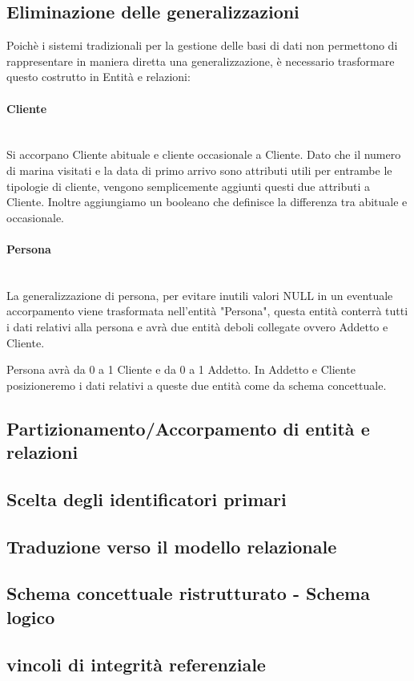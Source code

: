 \subsection{Eliminazione delle generalizzazioni}

Poichè i sistemi tradizionali per la gestione delle basi di dati non permettono di rappresentare in maniera diretta una generalizzazione, è necessario trasformare questo costrutto in Entità e relazioni:

\paragraph{Cliente}\mbox{}\\
Si accorpano Cliente abituale e cliente occasionale a Cliente. Dato che il numero di marina visitati e la data di primo arrivo sono attributi utili per entrambe le tipologie di cliente, vengono semplicemente aggiunti questi due attributi a Cliente. Inoltre aggiungiamo un booleano che definisce la differenza tra abituale e occasionale.
\paragraph{Persona}\mbox{}\\
La generalizzazione di persona, per evitare inutili valori NULL in un eventuale accorpamento viene trasformata nell'entità "Persona", questa entità conterrà tutti i dati relativi alla persona e avrà due entità deboli collegate ovvero Addetto e Cliente.

Persona avrà da 0 a 1 Cliente e da 0 a 1 Addetto. In Addetto e Cliente posizioneremo i dati relativi a queste due entità come da schema concettuale.

\subsection{Partizionamento/Accorpamento di entità e relazioni}

\subsection{Scelta degli identificatori primari}

\subsection{Traduzione verso il modello relazionale}

\subsection{Schema concettuale ristrutturato - Schema logico}

\subsection{vincoli di integrità referenziale}
